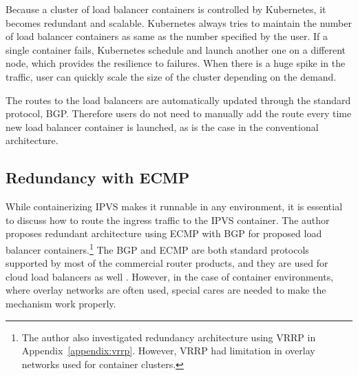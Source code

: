Because a cluster of load balancer containers is controlled by Kubernetes, it becomes redundant and scalable.
Kubernetes always tries to maintain the number of load balancer containers as same as the number specified by the user.
If a single container fails, Kubernetes schedule and launch another one on a different node, which provides the resilience to failures.
When there is a huge spike in the traffic, user can quickly scale the size of the cluster depending on the demand.

The routes to the load balancers are automatically updated through the standard protocol, BGP.
Therefore users do not need to manually add the route every time new load balancer container is launched, as is the case in the conventional architecture.

\FloatBarrier

\subsection{Redundancy with ECMP}\label{Redundancy with ECMP}

While containerizing IPVS makes it runnable in any environment, it is essential to discuss how to route the ingress traffic to the IPVS container.
The author proposes redundant architecture using ECMP with BGP for proposed load balancer containers.\footnote{The author also investigated redundancy architecture using VRRP in Appendix~\ref{appendix:vrrp}. However, VRRP had limitation in overlay networks used for container clusters.}
The BGP and ECMP are both standard protocols supported by most of the commercial router products, and they are used for cloud load balancers as well \cite{eisenbud2016maglev,patel2013ananta}.
However, in the case of container environments, where overlay networks are often used, special cares are needed to make the mechanism work properly.

